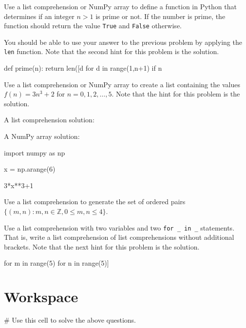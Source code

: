 \documentclass{ximera}
\begin{document}
\begin{question}
Use a list comprehension or NumPy array to define a function in Python that determines if an integer $n>1$ is prime or not. If the number is prime, the function should return the value \verb|True| and \verb|False| otherwise.
	\begin{hint}
	You should be able to use your answer to the previous problem by applying the \verb|len| function. Note that the second hint for this problem is the solution.
	\end{hint}
	\begin{hint}
\begin{sageCell}
def prime(n):
        return len([d for d in range(1,n+1) if n%
\end{sageCell}
	\end{hint}
\end{question}

\begin{question}
	Use a list comprehension or NumPy array to create a list containing the values $f(n)=3n^3+2$ for $n=0,1,2,\dots,5$. Note that the hint for this problem is the solution.
	\begin{hint}
A list comprehension solution:
\begin{sageCell}
\end{sageCell}
A NumPy array solution:
\begin{sageCell}
import numpy as np

x = np.arange(6)

3*x**3+1
\end{sageCell}
	\end{hint}
\end{question}

\begin{question}
	Use a list comprehension to generate the set of ordered pairs $\{(m,n):m,n\in\mathbb{Z}, 0\leq m,n\leq 4\}$. 
	\begin{hint}
	Use a list comprehension with two variables and two \verb|for _ in _| statements. That is, write a list comprehension of list comprehensions without additional brackets. Note that the next hint for this problem is the solution. 
	\end{hint}
	\begin{hint}
\begin{sageCell}
	[[m,n] for m in range(5) for n in range(5)]
\end{sageCell}
	\end{hint}
\end{question}

\section{Workspace}

\begin{sageCell}
# Use this cell to solve the above questions.
\end{sageCell}
\end{document}
